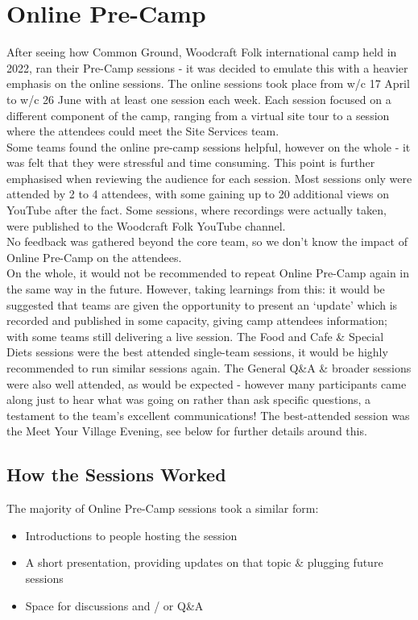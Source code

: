 \chapter{Online Pre-Camp}
After seeing how Common Ground, Woodcraft Folk international camp held in 2022, ran their Pre-Camp sessions - it was decided to emulate this with a heavier emphasis on the online sessions. The online sessions took place from w/c 17 April to w/c 26 June with at least one session each week. Each session focused on a different component of the camp, ranging from a virtual site tour to a session where the attendees could meet the Site Services team.\\

Some teams found the online pre-camp sessions helpful, however on the whole - it was felt that they were stressful and time consuming. This point is further emphasised when reviewing the audience for each session. Most sessions only were attended by 2 to 4 attendees, with some gaining up to 20 additional views on YouTube after the fact. Some sessions, where recordings were actually taken, were published to the Woodcraft Folk YouTube channel.\\

No feedback was gathered beyond the core team, so we don't know the impact of Online Pre-Camp on the attendees.\\

On the whole, it would not be recommended to repeat Online Pre-Camp again in the same way in the future. However, taking learnings from this: it would be suggested that teams are given the opportunity to present an `update' which is recorded and published in some capacity, giving camp attendees information; with some teams still delivering a live session. The Food and Cafe \& Special Diets sessions were the best attended single-team sessions, it would be highly recommended to run similar sessions again. The General Q\&A \& broader sessions were also well attended, as would be expected - however many participants came along just to hear what was going on rather than ask specific questions, a testament to the team's excellent communications! The best-attended session was the Meet Your Village Evening, see below for further details around this. 

\section{How the Sessions Worked}
The majority of Online Pre-Camp sessions took a similar form:
\begin{itemize}
    \item Introductions to people hosting the session
    \item A short presentation, providing updates on that topic \& plugging future sessions
    \item Space for discussions and / or Q\&A
\end{itemize}

